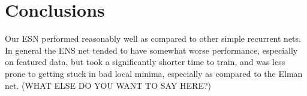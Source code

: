 \documentclass{acm_proc_article-sp}
\begin{document}
\section{Conclusions}
Our ESN performed reasonably well as compared to other simple recurrent nets. In general the ENS net tended to have somewhat worse performance, especially on featured data, but took a significantly shorter time to train, and was less prone to getting stuck in bad local minima, especially as compared to the Elman net. (WHAT ELSE DO YOU WANT TO SAY HERE?)




\balancecolumns
\end{document}
